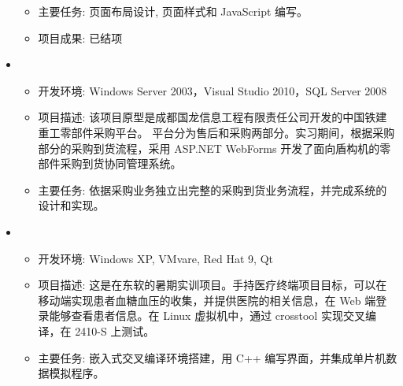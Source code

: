 \documentclass[letterpaper,11pt]{article}
\begin{document}
\begin{itemize}[leftmargin=*]
{\begin{itemize}
      \item 主要任务: 页面布局设计, 页面样式和 JavaScript 编写。
      \item 项目成果: 已结项
    \end{itemize}
    }
    \item
    {\footnotesize
    \begin{itemize}
      \item 开发环境: Windows Server 2003，Visual Studio 2010，SQL Server 2008
      \item 项目描述: 该项目原型是成都国龙信息工程有限责任公司开发的中国铁建重工零部件采购平台。 平台分为售后和采购两部分。实习期间，根据采购部分的采购到货流程，采用 ASP.NET WebForms 开发了面向盾构机的零部件采购到货协同管理系统。
      \item 主要任务: 依据采购业务独立出完整的采购到货业务流程，并完成系统的设计和实现。
    \end{itemize}
    }
    \item {}
    {\footnotesize
    \begin{itemize}
      \item 开发环境: Windows XP, VMvare, Red Hat 9, Qt
      \item 项目描述: 这是在东软的暑期实训项目。手持医疗终端项目目标，可以在移动端实现患者血糖血压的收集，并提供医院的相关信息，在 Web 端登录能够查看患者信息。在 Linux 虚拟机中，通过 crosstool 实现交叉编译，在 2410-S 上测试。
      \item 主要任务: 嵌入式交叉编译环境搭建，用 C++ 编写界面，并集成单片机数据模拟程序。
    \end{itemize}
    }
  \end{itemize}
\end{document}
